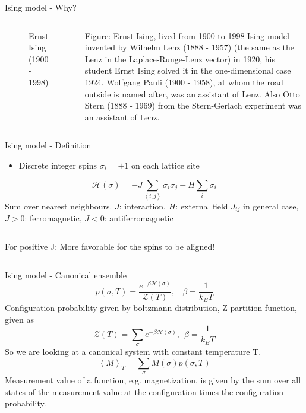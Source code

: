 \documentclass[handout]{beamer}
\begin{document}
\begin{frame}{Ising model - Why?}
\begin{columns}[c]
\begin{figure}[p]
		\caption{Ernst Ising (1900 - 1998)}
		\label{fig:awesome_image}
	\end{figure}
	 {Figure: Ernst Ising, lived from 1900 to 1998}
	 {Ising model invented by Wilhelm Lenz (1888 - 1957) (the same as the Lenz in the Laplace-Runge-Lenz vector) in 1920, his student Ernst Ising solved it in the one-dimensional case 1924.}
	 {Wolfgang Pauli (1900 - 1958), at whom the road outside is named after, was an assistant of Lenz.}
	 {Also Otto Stern (1888 - 1969) from the Stern-Gerlach experiment was an assistant of Lenz.}
\end{columns}
\end{frame}

\begin{frame}{Ising model - Definition}
\begin{itemize}
	 {Lattice with \(N\) sites.}
\item<2-> Discrete integer spins \( \sigma_i = \pm 1 \) on each lattice site
\end{itemize}
\pause
\[ \mathscr{H}(\sigma) = -J \sum\limits_{\left< i, j \right>} \sigma_i \sigma_j - H \sum\limits_i \sigma_i \]
	 {Sum over nearest neighbours.}
	 {\( J \): interaction, \( H \): external field}
	 {\( J_{ij} \) in general case, \( J>0 \): ferromagnetic, \( J<0 \): antiferromagnetic}
\pause
\begin{columns}[c]
	\def\svgwidth{.5\textwidth}
	\centering
	
	\def\svgwidth{.5\textwidth}
	\centering
	
		 {For positive J: More favorable for the spins to be aligned!}
\end{columns}
\end{frame}

\begin{frame}{Ising model - Canonical ensemble}
\pause
\[ p(\sigma, T) = \frac{e^{-\beta \mathscr{H}(\sigma)}}{\mathscr{Z}(T)}, \ \ \ \ \beta=\frac{1}{k_B T}\]
	 {Configuration probability given by boltzmann distribution, Z partition function, given as \[ \mathscr{Z}(T) = \sum_\sigma e^{-\beta \mathscr{H}(\sigma)},\ \ \beta = \frac{1}{k_B T} \]}
	 {So we are looking at a canonical system with constant temperature T.}
\pause
\[ \left< M \right>_T = \sum_\sigma M(\sigma)p(\sigma,T) \]
	 {Measurement value of a function, e.g. magnetization, is given by the sum over all states of the measurement value at the configuration times the configuration probability.}
\end{frame}
\end{document}

